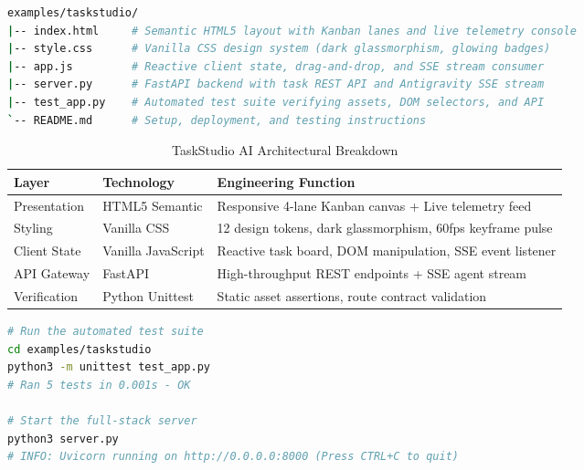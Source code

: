 \documentclass[11pt,a4paper,oneside]{book}
\begin{document}
\begin{lstlisting}[language=bash]
examples/taskstudio/
|-- index.html     # Semantic HTML5 layout with Kanban lanes and live telemetry console
|-- style.css      # Vanilla CSS design system (dark glassmorphism, glowing badges)
|-- app.js         # Reactive client state, drag-and-drop, and SSE stream consumer
|-- server.py      # FastAPI backend with task REST API and Antigravity SSE stream
|-- test_app.py    # Automated test suite verifying assets, DOM selectors, and API
`-- README.md      # Setup, deployment, and testing instructions
\end{lstlisting}

\begin{table}[htbp]
\centering
\caption{TaskStudio AI Architectural Breakdown}
\begin{tabularx}{\textwidth}{llX}
\toprule
\textbf{Layer} & \textbf{Technology} & \textbf{Engineering Function} \\
\midrule
Presentation & HTML5 Semantic & Responsive 4-lane Kanban canvas + Live telemetry feed \\
Styling & Vanilla CSS & 12 design tokens, dark glassmorphism, 60fps keyframe pulse \\
Client State & Vanilla JavaScript & Reactive task board, DOM manipulation, SSE event listener \\
API Gateway & FastAPI & High-throughput REST endpoints + SSE agent stream \\
Verification & Python Unittest & Static asset assertions, route contract validation \\
\bottomrule
\end{tabularx}
\end{table}

\begin{lstlisting}[language=bash]
# Run the automated test suite
cd examples/taskstudio
python3 -m unittest test_app.py
# Ran 5 tests in 0.001s - OK

# Start the full-stack server
python3 server.py
# INFO: Uvicorn running on http://0.0.0.0:8000 (Press CTRL+C to quit)
\end{lstlisting}
\end{document}
